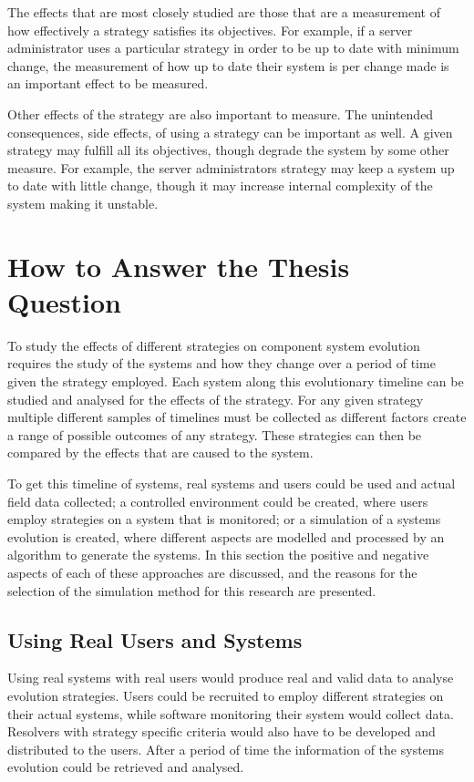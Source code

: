 The effects that are most closely studied are those that are a measurement of how effectively a strategy satisfies its objectives.
For example, if a server administrator uses a particular strategy in order to be up to date with minimum change,
the measurement of how up to date their system is per change made is an important effect to be measured.

Other effects of the strategy are also important to measure.
The unintended consequences, side effects, of using a strategy can be important as well.
A given strategy may fulfill all its objectives, though degrade the system by some other measure.
For example, the server administrators strategy may keep a system up to date with little change, 
though it may increase internal complexity of the system making it unstable. 

\section{How to Answer the Thesis Question}
To study the effects of different strategies on component system evolution requires the study of the systems and how they change over a period of time given the strategy employed. 
Each system along this evolutionary timeline can be studied and analysed for the effects of the strategy.
For any given strategy multiple different samples of timelines must be collected as different factors create a range of possible outcomes of any strategy.
These strategies can then be compared by the effects that are caused to the system.

To get this timeline of systems, real systems and users could be used and actual field data collected;
a controlled environment could be created, where users employ strategies on a system that is monitored;
or a simulation of a systems evolution is created, where different aspects are modelled and processed by an algorithm to generate the systems.
In this section the positive and negative aspects of each of these approaches are discussed,
and the reasons for the selection of the simulation method for this research are presented.

\subsection{Using Real Users and Systems}
Using real systems with real users would produce real and valid data to analyse evolution strategies.
Users could be recruited to employ different strategies on their actual systems, while software monitoring their system would collect data.
Resolvers with strategy specific criteria would also have to be developed and distributed to the users.
After a period of time the information of the systems evolution could be retrieved and analysed.

